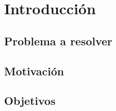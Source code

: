 \section{Introducción}

\subsection{Problema a resolver}

\subsection{Motivación}


\subsection{Objetivos}
